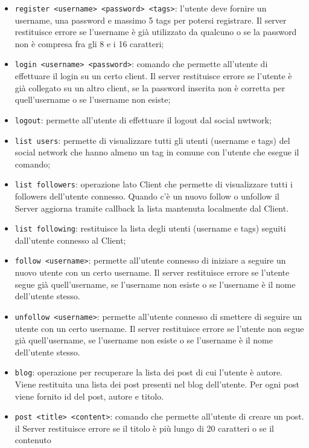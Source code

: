 \documentclass[11pt, a4paper, oneside]{article}
\begin{document}
\begin{itemize}
    \item \texttt{register <username> <password> <tags>}: l'utente deve fornire un username, una password e massimo 5 tags per potersi registrare. Il server restituisce errore
    se l'username è già utilizzato da qualcuno o se la password non è compresa fra gli 8 e i 16 caratteri;
    \item \texttt{login <username> <password>}: comando che permette all'utente di effettuare il login su un certo client. Il server restituisce errore se l'utente è già collegato
    su un altro client, se la password inserita non è corretta per quell'username o se l'username non esiste;
    \item \texttt{logout}: permette all'utente di effettuare il logout dal social nwtwork;
    \item \texttt{list users}: permette di visualizzare tutti gli utenti (username e tags) del social network che hanno almeno un tag in comune con l'utente che esegue il comando;
    \item \texttt{list followers}: operazione lato Client che permette di visualizzare tutti i followers dell'utente connesso. Quando c'è un nuovo follow o unfollow il Server
    aggiorna tramite callback la lista mantenuta localmente dal Client.
    \item \texttt{list following}: restituisce la lista degli utenti (username e tags) seguiti dall'utente connesso al Client;
    \item \texttt{follow <username>}: permette all'utente connesso di iniziare a seguire un nuovo utente con un certo username. Il server restituisce errore se l'utente segue già
    quell'username, se l'username non esiste o se l'username è il nome dell'utente stesso.
    \item \texttt{unfollow <username>}: permette all'utente connesso di smettere di seguire un utente con un certo username. Il server restituisce errore se l'utente non segue già
    quell'username, se l'username non esiste o se l'username è il nome dell'utente stesso.
    \item \texttt{blog}: operazione per recuperare la lista dei post di cui l’utente è autore. Viene restituita una lista dei post presenti nel blog dell’utente. 
    Per ogni post viene fornito id del post, autore e titolo. 
    \item \texttt{post <title> <content>}: comando che permette all'utente di creare un post. il Server restituisce errore se il titolo è più lungo di 20 caratteri o se il contenuto

\end{itemize}
\end{document}
